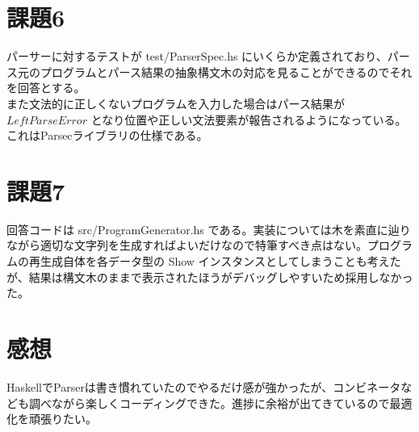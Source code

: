 \documentclass{jsarticle}
\begin{document}
\section{課題6}
パーサーに対するテストが test/ParserSpec.hs にいくらか定義されており、パース元のプログラムとパース結果の抽象構文木の対応を見ることができるのでそれを回答とする。\\
また文法的に正しくないプログラムを入力した場合はパース結果が $Left  ParseError$ となり位置や正しい文法要素が報告されるようになっている。これはParsecライブラリの仕様である。

\section{課題7}
回答コードは src/ProgramGenerator.hs である。実装については木を素直に辿りながら適切な文字列を生成すればよいだけなので特筆すべき点はない。プログラムの再生成自体を各データ型の Show インスタンスとしてしまうことも考えたが、結果は構文木のままで表示されたほうがデバッグしやすいため採用しなかった。

\section{感想}
HaskellでParserは書き慣れていたのでやるだけ感が強かったが、コンビネータなども調べながら楽しくコーディングできた。進捗に余裕が出てきているので最適化を頑張りたい。
\end{document}
